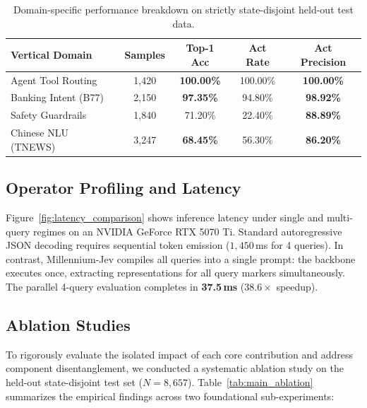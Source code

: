 \documentclass[11pt,a4paper]{article}
\begin{document}
\begin{table}[h]
\centering
\small
\begin{tabular}{lcccc}
\toprule
\textbf{Vertical Domain} & \textbf{Samples} & \textbf{Top-1 Acc} & \textbf{Act Rate} & \textbf{Act Precision} \\
\midrule
Agent Tool Routing & 1,420 & \textbf{100.00\%} & 100.00\% & \textbf{100.00\%} \\
Banking Intent (B77) & 2,150 & \textbf{97.35\%} & 94.80\% & \textbf{98.92\%} \\
Safety Guardrails & 1,840 & 71.20\% & 22.40\% & \textbf{88.89\%} \\
Chinese NLU (TNEWS) & 3,247 & \textbf{68.45\%} & 56.30\% & \textbf{86.20\%} \\
\bottomrule
\end{tabular}
\caption{Domain-specific performance breakdown on strictly state-disjoint held-out test data.}
\label{tab:domain_breakdown}
\end{table}

\subsection{Operator Profiling and Latency}
Figure~\ref{fig:latency_comparison} shows inference latency under single and multi-query regimes on an NVIDIA GeForce RTX 5070 Ti. Standard autoregressive JSON decoding requires sequential token emission ($1,450$\,ms for 4 queries). In contrast, Millennium-Jev compiles all queries into a single prompt: the backbone executes once, extracting representations for all query markers simultaneously. The parallel 4-query evaluation completes in \textbf{37.5\,ms} ($38.6\times$ speedup).

\subsection{Ablation Studies}
To rigorously evaluate the isolated impact of each core contribution and address component disentanglement, we conducted a systematic ablation study on the held-out state-disjoint test set ($N=8,657$). Table~\ref{tab:main_ablation} summarizes the empirical findings across two foundational sub-experiments:
\end{document}
